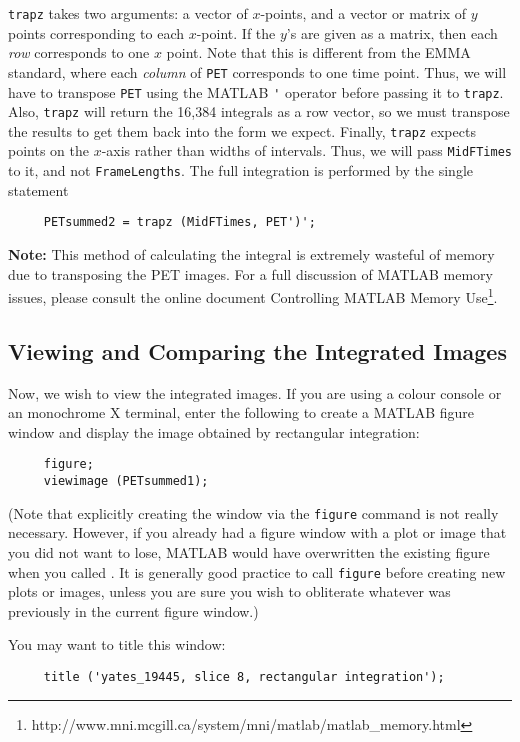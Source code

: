 \verb|trapz| takes two arguments: a vector of $x$-points, and a vector
or matrix of $y$ points corresponding to each $x$-point.  If the $y$'s
are given as a matrix, then each {\em row} corresponds to one $x$
point.  Note that this is different from the EMMA standard, where each
{\em column} of \verb|PET| corresponds to one time point.  Thus, we
will have to transpose \verb|PET| using the MATLAB \verb|'| operator
before passing it to \verb|trapz|.  Also, \verb|trapz| will return the
16,384 integrals as a row vector, so we must transpose the results to
get them back into the form we expect.  Finally, \verb|trapz| expects
points on the $x$-axis rather than widths of intervals.  Thus, we will
pass \verb|MidFTimes| to it, and not \verb|FrameLengths|.  The full
integration is performed by the single statement
\begin{verbatim}
     PETsummed2 = trapz (MidFTimes, PET')';
\end{verbatim}

{\bf Note:} This method of calculating the integral is
extremely wasteful of memory due to transposing the PET images.  For a
full discussion of MATLAB memory issues, please consult the online
document Controlling MATLAB Memory
Use\footnote{http://www.mni.mcgill.ca/system/mni/matlab/matlab\_memory.html}.



\subsection{Viewing and Comparing the Integrated Images}

Now, we wish to view the integrated images.  If you are using a colour
console or an monochrome X terminal, enter the following to create a
MATLAB figure window and display the image obtained by rectangular
integration:
\begin{verbatim}
     figure;
     viewimage (PETsummed1);
\end{verbatim}
(Note that explicitly creating the window via the \verb|figure|
command is not really necessary.  However, if you already had a
figure window with a plot or image that you did not want to lose,
MATLAB would have overwritten the existing figure when you called
.  It is generally good practice to call
\verb|figure| before creating new plots or images, unless you are
sure you wish to obliterate whatever was previously in the current
figure window.)

You may want to title this window:
\begin{verbatim}
     title ('yates_19445, slice 8, rectangular integration');
\end{verbatim}

